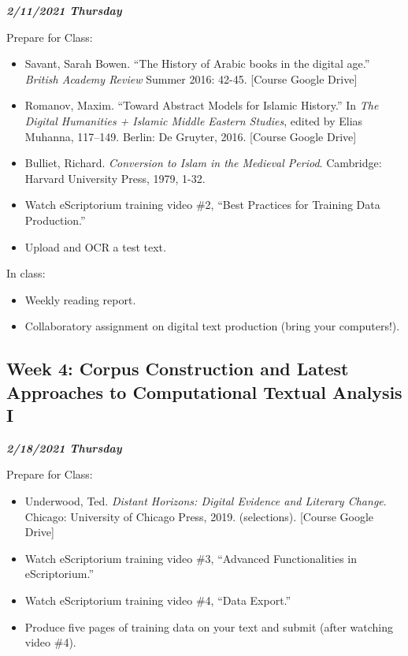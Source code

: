 \documentclass[
]{book}
\providecommand{\tightlist}{%
  \setlength{\itemsep}{0pt}\setlength{\parskip}{0pt}}
\begin{document}
\textbf{\emph{2/11/2021 Thursday}}

Prepare for Class:

\begin{itemize}
\tightlist
\item
  Savant, Sarah Bowen. ``The History of Arabic books in the digital age.'' \emph{British Academy Review} Summer 2016: 42-45. {[}Course Google Drive{]}\\
\item
  Romanov, Maxim. ``Toward Abstract Models for Islamic History.'' In \emph{The Digital Humanities + Islamic Middle Eastern Studies}, edited by Elias Muhanna, 117--149. Berlin: De Gruyter, 2016. {[}Course Google Drive{]}
\item
  Bulliet, Richard. \emph{Conversion to Islam in the Medieval Period}. Cambridge: Harvard University Press, 1979, 1-32.
\item
  Watch eScriptorium training video \#2, ``Best Practices for Training Data Production.''
\item
  Upload and OCR a test text.
\end{itemize}

In class:

\begin{itemize}
\tightlist
\item
  Weekly reading report.
\item
  Collaboratory assignment on digital text production (bring your computers!).
\end{itemize}

\hypertarget{week-4-corpus-construction-and-latest-approaches-to-computational-textual-analysis-i}{%
\subsection{Week 4: Corpus Construction and Latest Approaches to Computational Textual Analysis I}\label{week-4-corpus-construction-and-latest-approaches-to-computational-textual-analysis-i}}

\textbf{\emph{2/18/2021 Thursday}}

Prepare for Class:

\begin{itemize}
\tightlist
\item
  Underwood, Ted. \emph{Distant Horizons: Digital Evidence and Literary Change}. Chicago: University of Chicago Press, 2019. (selections). {[}Course Google Drive{]}
\item
  Watch eScriptorium training video \#3, ``Advanced Functionalities in eScriptorium.''
\item
  Watch eScriptorium training video \#4, ``Data Export.''
\item
  Produce five pages of training data on your text and submit (after watching video \#4).
\end{itemize}
\end{document}
